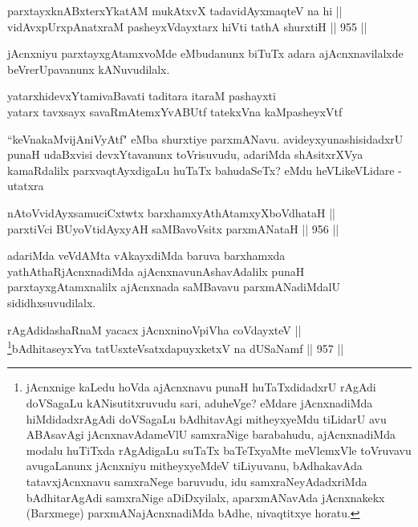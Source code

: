 \begin{shl}
parxtayxknABxterxYkatAM mukAtxvX tadavidAyxmaqteV na hi || \\
vidAvxpUrxpAnatxraM pasheyxVdayxtarx hiVti tathA shurxtiH \hfill || 955 ||  
\end{shl}

\begin{artha}
jAcnxniyu parxtayxgAtamxvoMde eMbudanunx biTuTx adara ajAcnxnavilalxde beVrerUpavanunx kANuvudilalx.
\end{artha}
	
\begin{shl}
yatarxhidevxYtamivaBavati taditara itaraM pashayxti \\
yatarx tavxsayx savaRmAtemxYvABUtf tatekxVna kaMpasheyxVtf
\end{shl}	
	
\begin{artha}
``keVnakaMvijAniVyAtf" eMba shurxtiye parxmANavu. avideyxyunashisidadxrU punaH udaBxvisi devxYtavanunx toVrisuvudu, adariMda shAsitxrXVya kamaRdalilx parxvaqtAyxdigaLu huTaTx bahudaSeTx? eMdu heVLikeVLidare - utatxra
\end{artha}

\begin{shl}
nAtoV\s vidAyxsamuciCxtwtx barxhamxyAthAtamxyXboVdhataH || \\
parxtiVci BUyoV\s tidAyxyAH saMBavoV\s sitx parxmANataH \hfill || 956 ||  
\end{shl}

\begin{artha}
adariMda veVdAMta vAkayxdiMda baruva barxhamxda yathAthaRjAcnxnadiMda ajAcnxnavunAshavAdalilx punaH parxtayxgAtamxnalilx ajAcnxnada saMBavavu parxmANadiMdalU sididhxsuvudilalx.
\end{artha}


\begin{shl}
rAgAdidashaRnaM yacacx jAcnxninoV\s piVha coVdayxteV || \\
\footnote{jAcnxnige kaLedu hoVda ajAcnxnavu punaH huTaTxdidadxrU rAgAdi doVSagaLu kANisutitxruvudu sari, aduheVge? eMdare jAcnxnadiMda hiMdidadxrAgAdi doVSagaLu bAdhitavAgi mitheyxyeMdu tiLidarU avu ABAsavAgi jAcnxnavAdameVlU samxraNige barabahudu, ajAcnxnadiMda modalu huTiTxda rAgAdigaLu suTaTx baTeTxyaMte meVlemxVle toVruvavu avugaLanunx jAcnxniyu mitheyxyeMdeV tiLiyuvanu, bAdhakavAda tatavxjAcnxnavu samxraNege baruvudu, idu samxraNeyAdadxriMda bAdhitarAgAdi samxraNige aDiDxyilalx, aparxmANavAda jAcnxnakekx (Barxmege) parxmANajAcnxnadiMda bAdhe, nivaqtitxye horatu.}bAdhitaseyxYva tatUsxteVsatxdapuyxketxV na dUSaNamf \hfill || 957 ||  
\end{shl}


